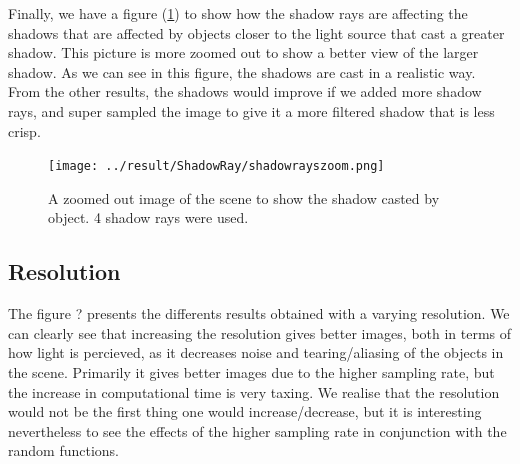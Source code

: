 \documentclass[12pt]{article}
\numberwithin{equation}{section}
\begin{document}
 
 Finally, we have a figure (\ref{fig:shadowrayzoom}) to show how the shadow rays are affecting the shadows that are affected by objects closer to the light source that cast a greater shadow. This picture is more zoomed out to show a better view of the larger shadow. As we can see in this figure, the shadows are cast in a realistic way. From the other results, the shadows would improve if we added more shadow rays, and super sampled the image to give it a more filtered shadow that is less crisp.
 
 
\begin{figure}
  \begin{center}
    \texttt{[image: ../result/ShadowRay/shadowrayszoom.png]}
    \caption{A zoomed out image of the scene to show the shadow casted by object. 4 shadow rays were used.}
    \label{fig:shadowrayzoom}
  \end{center}
\end{figure}
 
 
 
\subsection{Resolution}

The figure ? presents the differents results obtained with a varying resolution. We can clearly see that increasing the resolution gives better images, both in terms of how light is percieved, as it decreases noise and tearing/aliasing of the objects in the scene. Primarily it gives better images due to the higher sampling rate, but the increase in computational time is very taxing. We realise that the resolution would not be the first thing one would increase/decrease, but it is interesting nevertheless to see the effects of the higher sampling rate in conjunction with the random functions.
\end{document}

